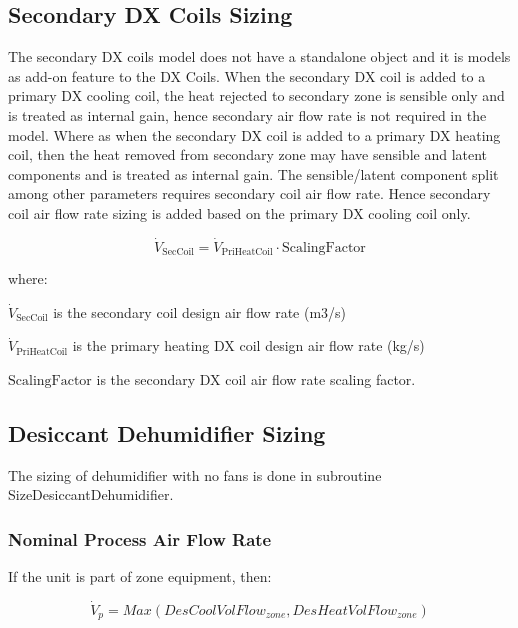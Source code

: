 \subsection{Secondary DX Coils Sizing}\label{secondary-dx-coils-sizing}

The secondary DX coils model does not have a standalone object and it is models as add-on feature to the DX Coils. When the secondary DX coil is added to a primary DX cooling coil, the heat rejected to secondary zone is sensible only and is treated as internal gain, hence secondary air flow rate is not required in the model. Where as when the secondary DX coil is added to a primary DX heating coil, then the heat removed from secondary zone may have sensible and latent components and is treated as internal gain. The sensible/latent component split among other parameters requires secondary coil air flow rate. Hence secondary coil air flow rate sizing is added based on the primary DX cooling coil only.

\begin{equation}
  \dot{V}_{\mathrm{SecCoil}} = \dot{V}_{\mathrm{PriHeatCoil}} \cdot \text{ScalingFactor}
\end{equation}

where:

\(\dot{V}_\text{SecCoil}\) is the secondary coil design air flow rate (m3/s)

\(\dot{V}_\text{PriHeatCoil}\) is the primary heating DX coil design air flow rate (kg/s)

\(\text{ScalingFactor}\) is the secondary DX coil air flow rate scaling factor.

\subsection{Desiccant Dehumidifier Sizing}\label{desiccant-dehumidifier-sizing}

The sizing of dehumidifier with no fans is done in subroutine SizeDesiccantDehumidifier.

\subsubsection{Nominal Process Air Flow Rate}\label{nominal-process-air-flow-rate}

If the unit is part of zone equipment, then:

\begin{equation}
{\dot V_p} = Max\left( {DesCoolVolFlo{w_{zone}},DesHeatVolFlo{w_{zone}}} \right)
\end{equation}


